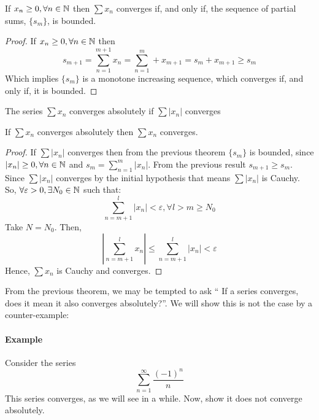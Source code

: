 \begin{theorem}
    If $x_n \geq 0, \forall n \in \mathbb{N}$ then $\sum x_n$ converges if, and only if, the sequence of partial sums, $\{s_m\}$, is bounded.
\end{theorem}

\begin{proof}
    If $x_n \geq 0, \forall n \in \mathbb{N}$ then
    \begin{equation*}
        s_{m+1} = \sum \limits_{n=1}^{m+1} x_n = \sum \limits_{n=1}^m + x_{m+1} = s_m + x_{m+1} \geq s_m
    \end{equation*}
    Which implies $\{s_m\}$ is a monotone increasing sequence, which converges if, and only if, it is bounded.
\end{proof}

\begin{definition}
    The series $\sum x_n$ converges absolutely if $\sum |x_n|$ converges
\end{definition}

\begin{theorem}
    If $\sum x_n$ converges absolutely then $\sum x_n$ converges.
\end{theorem}

\begin{proof}
    If $\sum |x_n|$ converges then from the previous theorem $\{s_m\}$ is bounded, since $|x_n| \geq 0, \forall n \in \mathbb{N}$ and $s_m = \sum_{n=1}^m |x_n|$. From the previous result $s_{m+1} \geq s_m$. Since $\sum |x_n|$ converges by the initial hypothesis that means $\sum |x_n|$ is Cauchy. So, $\forall \varepsilon > 0, \exists N_0 \in \mathbb{N}$ such that:
    \begin{equation*}
        \sum \limits_{n=m+1}^l |x_n| < \varepsilon, \forall l > m \geq N_0
    \end{equation*}
    Take $N = N_0$. Then, 
    \begin{equation*}
        \left |
            \sum \limits_{n=m+1}^l x_n
        \right | \leq
        \sum \limits_{n=m+1}^l |x_n|
        < \varepsilon
    \end{equation*}
    Hence, $\sum x_n$ is Cauchy and converges.
\end{proof}

From the previous theorem, we may be tempted to ask `` If a series converges, does it mean it also converges absolutely?''. We will show this is not the case by a counter-example:
\paragraph{Example} Consider the series
\begin{equation*}
    \sum \limits_{n=1}^\infty \frac{(-1)^n}{n}
\end{equation*}
This series converges, as we will see in a while. Now, show it does not converge absolutely.

